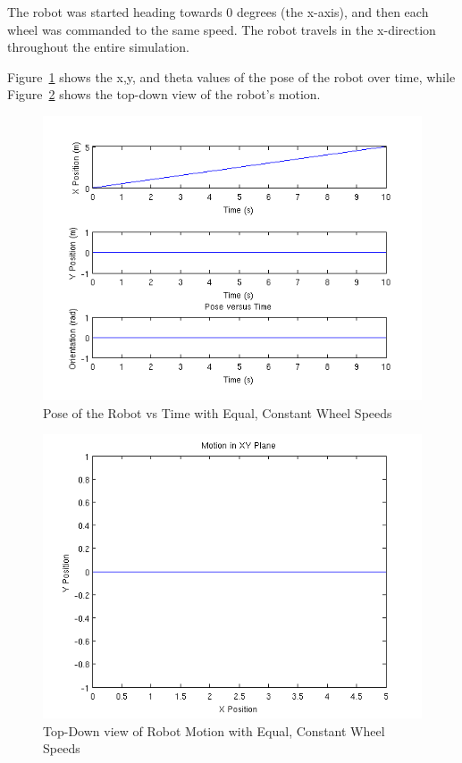 \documentclass[10pt]{article}
\begin{document}
The robot was started heading towards 0 degrees (the x-axis), and then each wheel was commanded to the same speed.  The robot travels in the x-direction throughout the entire simulation.

Figure~\ref{fig:equalconstantpose} shows the x,y, and theta values of the pose of the robot over time, while Figure~\ref{fig:equalconstantplane} shows the top-down view of the robot's motion.

\begin{figure}[h]
 \centering
 \includegraphics[scale=0.55,keepaspectratio=true]{equalconstantpose.png}
 \caption{Pose of the Robot vs Time with Equal, Constant Wheel Speeds}
 \label{fig:equalconstantpose}
\end{figure}

\begin{figure}[h]
 \centering
 \includegraphics[scale=0.55,keepaspectratio=true]{equalconstantplane.png}
 \caption{Top-Down view of Robot Motion with Equal, Constant Wheel Speeds}
 \label{fig:equalconstantplane}
\end{figure}
\end{document}
